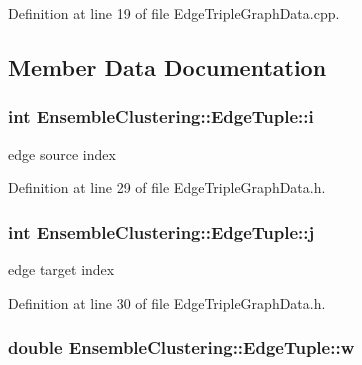 Definition at line 19 of file Edge\-Triple\-Graph\-Data.\-cpp.



\subsection{Member Data Documentation}
\hypertarget{class_ensemble_clustering_1_1_edge_tuple_acf12140619e42d9e60ccf402caf0730d}{
\subsubsection[{i}]{\setlength{\rightskip}{0pt plus 5cm}int Ensemble\-Clustering\-::\-Edge\-Tuple\-::i}}\label{class_ensemble_clustering_1_1_edge_tuple_acf12140619e42d9e60ccf402caf0730d}


edge source index 



Definition at line 29 of file Edge\-Triple\-Graph\-Data.\-h.

\hypertarget{class_ensemble_clustering_1_1_edge_tuple_a8f3e5de46a3c3e1eefeda14d6330eaab}{
\subsubsection[{j}]{\setlength{\rightskip}{0pt plus 5cm}int Ensemble\-Clustering\-::\-Edge\-Tuple\-::j}}\label{class_ensemble_clustering_1_1_edge_tuple_a8f3e5de46a3c3e1eefeda14d6330eaab}


edge target index 



Definition at line 30 of file Edge\-Triple\-Graph\-Data.\-h.

\hypertarget{class_ensemble_clustering_1_1_edge_tuple_a5dbd8079be78b2057d441f79eae7c905}{
\subsubsection[{w}]{\setlength{\rightskip}{0pt plus 5cm}double Ensemble\-Clustering\-::\-Edge\-Tuple\-::w}}\label{class_ensemble_clustering_1_1_edge_tuple_a5dbd8079be78b2057d441f79eae7c905}


